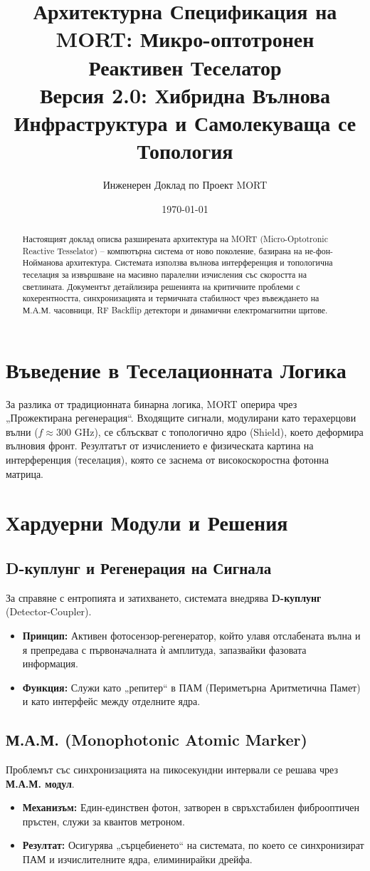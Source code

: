 \documentclass[11pt,a4paper]{article}
\title{Архитектурна Спецификация на MORT: Микро-оптотронен Реактивен Теселатор \\ \large Версия 2.0: Хибридна Вълнова Инфраструктура и Самолекуваща се Топология}
\author{Инженерен Доклад по Проект MORT}
\date{\today}
\begin{document}
\maketitle

\begin{abstract}
Настоящият доклад описва разширената архитектура на MORT (Micro-Optotronic Reactive Tesselator) – компютърна система от ново поколение, базирана на не-фон-Нойманова архитектура. Системата използва вълнова интерференция и топологична теселация за извършване на масивно паралелни изчисления със скоростта на светлината. Документът детайлизира решенията на критичните проблеми с кохерентността, синхронизацията и термичната стабилност чрез въвеждането на М.А.М. часовници, RF Backflip детектори и динамични електромагнитни щитове.
\end{abstract}

\section{Въведение в Теселационната Логика}
За разлика от традиционната бинарна логика, MORT оперира чрез „Прожектирана регенерация“. Входящите сигнали, модулирани като терахерцови вълни ($f \approx 300$ GHz), се сблъскват с топологично ядро (Shield), което деформира вълновия фронт. Резултатът от изчислението е физическата картина на интерференция (теселация), която се заснема от високоскоростна фотонна матрица.

\section{Хардуерни Модули и Решения}

\subsection{D-куплунг и Регенерация на Сигнала}
За справяне с ентропията и затихването, системата внедрява \textbf{D-куплунг} (Detector-Coupler). 
\begin{itemize}
    \item \textbf{Принцип:} Активен фотосензор-регенератор, който улавя отслабената вълна и я препредава с първоначалната ѝ амплитуда, запазвайки фазовата информация.
    \item \textbf{Функция:} Служи като „репитер“ в ПАМ (Периметърна Аритметична Памет) и като интерфейс между отделните ядра.
\end{itemize}

\subsection{М.А.М. (Monophotonic Atomic Marker)}
Проблемът със синхронизацията на пикосекундни интервали се решава чрез \textbf{М.А.М. модул}. 
\begin{itemize}
    \item \textbf{Механизъм:} Един-единствен фотон, затворен в свръхстабилен фиброоптичен пръстен, служи за квантов метроном.
    \item \textbf{Резултат:} Осигурява „сърцебиенето“ на системата, по което се синхронизират ПАМ и изчислителните ядра, елиминирайки дрейфа.
\end{itemize}
\end{document}
